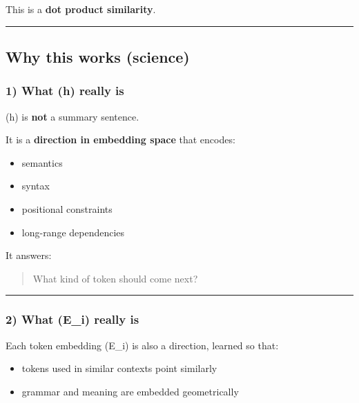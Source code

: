 \documentclass[
]{article}
\providecommand{\tightlist}{%
  \setlength{\itemsep}{0pt}\setlength{\parskip}{0pt}}
\begin{document}
This is a \textbf{dot product similarity}.

\begin{center}\rule{0.5\linewidth}{0.5pt}\end{center}

\hypertarget{why-this-works-science}{%
\subsection{Why this works (science)}\label{why-this-works-science}}

\hypertarget{what-h-really-is}{%
\subsubsection{1) What (h) really is}\label{what-h-really-is}}

(h) is \textbf{not} a summary sentence.

It is a \textbf{direction in embedding space} that encodes:

\begin{itemize}
\tightlist
\item
  semantics
\item
  syntax
\item
  positional constraints
\item
  long-range dependencies
\end{itemize}

It answers:

\begin{quote}
What kind of token should come next?
\end{quote}

\begin{center}\rule{0.5\linewidth}{0.5pt}\end{center}

\hypertarget{what-e_i-really-is}{%
\subsubsection{2) What (E\_i) really is}\label{what-e_i-really-is}}

Each token embedding (E\_i) is also a direction, learned so that:

\begin{itemize}
\tightlist
\item
  tokens used in similar contexts point similarly
\item
  grammar and meaning are embedded geometrically
\end{itemize}
\end{document}
